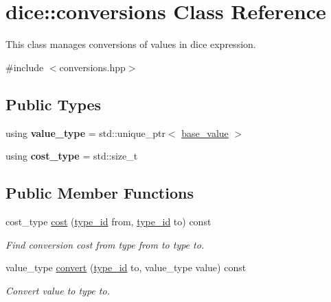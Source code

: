 \hypertarget{classdice_1_1conversions}{}\section{dice\+:\+:conversions Class Reference}
\label{classdice_1_1conversions}


This class manages conversions of values in dice expression.  




{\ttfamily \#include $<$conversions.\+hpp$>$}

\subsection*{Public Types}
\begin{DoxyCompactItemize}
\item 
\mbox{\label{classdice_1_1conversions_afa76a68a1fb1140608ba48da6f7bc0bd}} 
using {\bfseries value\+\_\+type} = std\+::unique\+\_\+ptr$<$ \mbox{\hyperlink{classdice_1_1base__value}{base\+\_\+value}} $>$
\item 
\mbox{\label{classdice_1_1conversions_a62ec635e5e7832c05bf351dae4b135e4}} 
using {\bfseries cost\+\_\+type} = std\+::size\+\_\+t
\end{DoxyCompactItemize}
\subsection*{Public Member Functions}
\begin{DoxyCompactItemize}
\item 
cost\+\_\+type \mbox{\hyperlink{classdice_1_1conversions_adbc4f917f240f7ab4440cfc7d81e6250}{cost}} (\mbox{\hyperlink{value_8hpp_ab9af7d8ecc381e026ca4d07a745f23eb}{type\+\_\+id}} from, \mbox{\hyperlink{value_8hpp_ab9af7d8ecc381e026ca4d07a745f23eb}{type\+\_\+id}} to) const
\begin{DoxyCompactList}\small\item\em Find conversion cost from type {\ttfamily from} to type {\ttfamily to}. \end{DoxyCompactList}\item 
value\+\_\+type \mbox{\hyperlink{classdice_1_1conversions_ab6a95940f7c218a4e610a81b9b838291}{convert}} (\mbox{\hyperlink{value_8hpp_ab9af7d8ecc381e026ca4d07a745f23eb}{type\+\_\+id}} to, value\+\_\+type value) const
\begin{DoxyCompactList}\small\item\em Convert value to type {\ttfamily to}. \end{DoxyCompactList}\end{DoxyCompactItemize}
